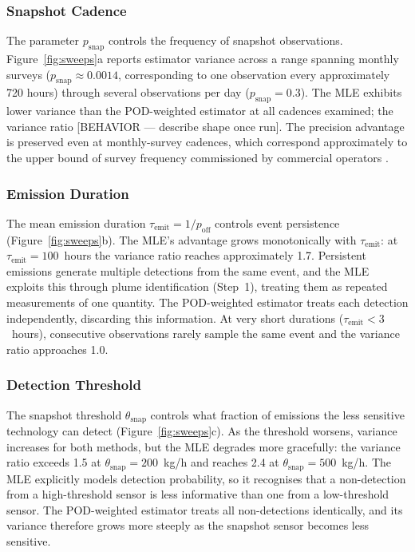 \documentclass[unnumsec,webpdf,modern,mediumone]{oup-authoring-template}
\newcommand{\new}[1]{{\color{blue}#1}}
\begin{document}
\subsubsection{Snapshot Cadence}
\new{The parameter $p_{\text{snap}}$ controls the frequency of snapshot observations. Figure~\ref{fig:sweeps}a reports estimator variance across a range spanning monthly surveys ($p_{\text{snap}} \approx 0.0014$, corresponding to one observation every approximately 720 hours) through several observations per day ($p_{\text{snap}} = 0.3$). The MLE exhibits lower variance than the POD-weighted estimator at all cadences examined; the variance ratio [BEHAVIOR — describe shape once run]. The precision advantage is preserved even at monthly-survey cadences, which correspond approximately to the upper bound of survey frequency commissioned by commercial operators \citep{[REF]}.}

\subsubsection{Emission Duration}

The mean emission duration $\tau_\text{emit} = 1/p_{\text{off}}$ controls event persistence (Figure~\ref{fig:sweeps}b). The MLE's advantage grows monotonically with $\tau_\text{emit}$: at $\tau_\text{emit} = 100$~hours the variance ratio reaches approximately 1.7. Persistent emissions generate multiple detections from the same event, and the MLE exploits this through plume identification (Step~1), treating them as repeated measurements of one quantity. The POD-weighted estimator treats each detection independently, discarding this information. At very short durations ($\tau_\text{emit} < 3$~hours), consecutive observations rarely sample the same event and the variance ratio approaches 1.0.


\subsubsection{Detection Threshold}

The snapshot threshold $\theta_{\text{snap}}$ controls what fraction of emissions the less sensitive technology can detect (Figure~\ref{fig:sweeps}c). As the threshold worsens, variance increases for both methods, but the MLE degrades more gracefully: the variance ratio exceeds 1.5 at $\theta_{\text{snap}} = 200$~kg/h and reaches 2.4 at $\theta_{\text{snap}} = 500$~kg/h. The MLE explicitly models detection probability, so it recognises that a non-detection from a high-threshold sensor is less informative than one from a low-threshold sensor. The POD-weighted estimator treats all non-detections identically, and its variance therefore grows more steeply as the snapshot sensor becomes less sensitive.
\end{document}
